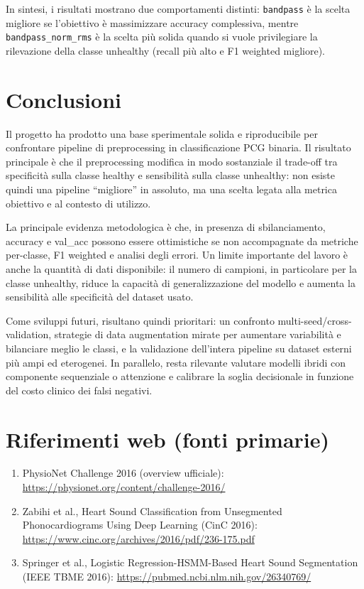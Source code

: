 \documentclass[12pt,a4paper]{article}
\begin{document}
In sintesi, i risultati mostrano due comportamenti distinti: \texttt{bandpass} è la scelta migliore
se l'obiettivo è massimizzare accuracy complessiva, mentre \texttt{bandpass\_norm\_rms} è la scelta
più solida quando si vuole privilegiare la rilevazione della classe unhealthy (recall più alto e
F1 weighted migliore).

\section{Conclusioni}
Il progetto ha prodotto una base sperimentale solida e riproducibile per confrontare pipeline di
preprocessing in classificazione PCG binaria. Il risultato principale è che il preprocessing
modifica in modo sostanziale il trade-off tra specificità sulla classe healthy e sensibilità sulla
classe unhealthy: non esiste quindi una pipeline ``migliore'' in assoluto, ma una scelta legata
alla metrica obiettivo e al contesto di utilizzo.

La principale evidenza metodologica è che, in presenza di sbilanciamento, accuracy e val\_acc
possono essere ottimistiche se non accompagnate da metriche per-classe, F1 weighted e analisi
degli errori. Un limite importante del lavoro è anche la quantità di dati disponibile: il numero di
campioni, in particolare per la classe unhealthy, riduce la capacità di generalizzazione del
modello e aumenta la sensibilità alle specificità del dataset usato.

Come sviluppi futuri, risultano quindi prioritari: un confronto multi-seed/cross-validation,
strategie di data augmentation mirate per aumentare variabilità e bilanciare meglio le classi, e la
validazione dell'intera pipeline su dataset esterni più ampi ed eterogenei. In parallelo, resta
rilevante valutare modelli ibridi con componente sequenziale o attenzione e calibrare la soglia
decisionale in funzione del costo clinico dei falsi negativi.

\section*{Riferimenti web (fonti primarie)}
\begin{enumerate}[leftmargin=*,label=\arabic*.]
    \item PhysioNet Challenge 2016 (overview ufficiale): \url{https://physionet.org/content/challenge-2016/}
    \item Zabihi et al., Heart Sound Classification from Unsegmented Phonocardiograms Using Deep Learning (CinC 2016): \url{https://www.cinc.org/archives/2016/pdf/236-175.pdf}
    \item Springer et al., Logistic Regression-HSMM-Based Heart Sound Segmentation (IEEE TBME 2016): \url{https://pubmed.ncbi.nlm.nih.gov/26340769/}
\end{enumerate}
\end{document}

